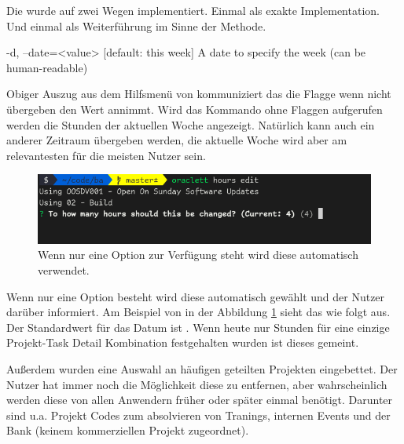 \documentclass[oneside,bibliography=totocnumbered,BCOR=5mm]{scrbook}
\newenvironment{code}{\captionsetup{type=listing, skip=0pt}}{}
\begin{document}

Die  wurde auf zwei Wegen implementiert. Einmal als
exakte Implementation. Und einmal als Weiterführung im Sinne der Methode.

\begin{code}
  \begin{shellcode}
-d, --date=<value>  [default: this week] A date to specify the week (can be human-readable)
  \end{shellcode}
  \medskip
\end{code}

Obiger Auszug aus dem Hilfsmenü von  kommuniziert das
die  Flagge wenn nicht übergeben den Wert  annimmt. Wird das Kommando  ohne Flaggen aufgerufen
werden die Stunden der aktuellen Woche angezeigt. Natürlich kann auch ein
anderer Zeitraum übergeben werden, die aktuelle Woche wird aber am relevantesten
für die meisten Nutzer sein.

\medskip

\begin{figure}
  \centering
  \includegraphics[scale=0.5]{hours-edit-defaults.png}
  \caption{Wenn nur eine Option zur Verfügung steht wird diese automatisch verwendet.}
  \label{fig:hours-edit-defaults}
\end{figure}

Wenn nur eine Option besteht wird diese automatisch gewählt und der Nutzer
darüber informiert. Am Beispiel von  in der Abbildung
\ref{fig:hours-edit-defaults} sieht das wie folgt aus. Der Standardwert für
das Datum ist . Wenn heute nur Stunden für eine einzige
Projekt-Task Detail Kombination festgehalten wurden ist dieses gemeint.

Außerdem wurden eine Auswahl an häufigen geteilten Projekten eingebettet. Der
Nutzer hat immer noch die Möglichkeit diese zu entfernen, aber wahrscheinlich
werden diese von allen Anwendern früher oder später einmal benötigt. Darunter
sind u.a. Projekt Codes zum absolvieren von Tranings, internen Events und der
Bank (keinem kommerziellen Projekt zugeordnet).
\end{document}

